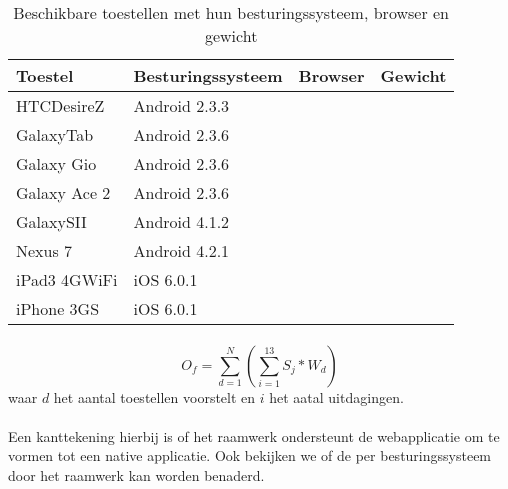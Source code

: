 \begin{table}[h]
  \centering
  \begin{tabular}{llll}
    \toprule
    \textbf{Toestel} & \textbf{Besturingssysteem} & \textbf{Browser} & \textbf{Gewicht}\\
    \midrule
    HTCDesireZ & Android 2.3.3 &  & \\
    GalaxyTab & Android 2.3.6 &  & \\
    Galaxy Gio & Android 2.3.6 &  & \\
    Galaxy Ace 2 & Android 2.3.6 &  & \\
    GalaxySII & Android 4.1.2 &  & \\
    Nexus 7 & Android 4.2.1  &  & \\
    iPad3 4GWiFi & iOS 6.0.1 &  & \\
    iPhone 3GS & iOS 6.0.1 &  & \\
    \bottomrule
  \end{tabular}
  \caption{Beschikbare toestellen met hun besturingssysteem, browser en gewicht}
  \label{tabel:toestellen-hci}
\end{table}

\paragraph{}
\begin{equation}
  O_f = \sum_{d=1}^{N}{\left(\sum_{i=1}^{13}S_j*W_d\right)}
  \label{eq:ondersteuning}
\end{equation}
waar $d$ het aantal toestellen voorstelt en $i$ het aatal uitdagingen. 
\paragraph{}
Een kanttekening hierbij is of het raamwerk ondersteunt de webapplicatie om te vormen tot een native applicatie. 
Ook bekijken we of de  per besturingssysteem door het raamwerk kan worden benaderd.

